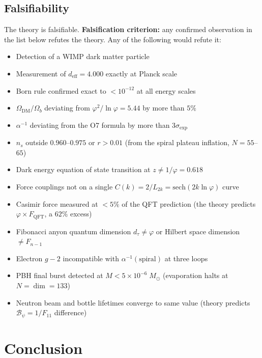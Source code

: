 \documentclass[12pt,a4paper]{article}
\begin{document}
\subsection{Falsifiability}

The theory is falsifiable. \textbf{Falsification criterion:} any confirmed observation in the list below refutes the theory. Any of the following would refute it:
\begin{itemize}
\item Detection of a WIMP dark matter particle
\item Measurement of $d_{\mathrm{eff}} = 4.000$ exactly at Planck scale
\item Born rule confirmed exact to $< 10^{-12}$ at all energy scales
\item $\Omega_{\text{DM}}/\Omega_b$ deviating from $\varphi^2/\ln\varphi = 5.44$ by more than $5\%$
\item $\alpha^{-1}$ deviating from the O7 formula by more than $3\sigma_{\text{exp}}$
\item $n_s$ outside $0.960$--$0.975$ or $r > 0.01$ (from the spiral plateau inflation, $N = 55$--$65$)
\item Dark energy equation of state transition at $z \neq 1/\varphi = 0.618$
\item Force couplings not on a single $C(k) = 2/L_{2k} = \mathrm{sech}(2k\ln\varphi)$ curve
\item Casimir force measured at $< 5\%$ of the QFT prediction (the theory predicts $\varphi \times F_{\mathrm{QFT}}$, a $62\%$ excess)
\item Fibonacci anyon quantum dimension $d_\tau \neq \varphi$ or Hilbert space dimension $\neq F_{n-1}$
\item Electron $g{-}2$ incompatible with $\alpha^{-1}(\text{spiral})$ at three loops
\item PBH final burst detected at $M < 5 \times 10^{-6}\;M_\odot$ (evaporation halts at $N = \dim = 133$)
\item Neutron beam and bottle lifetimes converge to same value (theory predicts $\mathcal{B}_\psi = 1/F_{11}$ difference)
\end{itemize}




\section{Conclusion}
\label{sec:conclusion}
\end{document}
